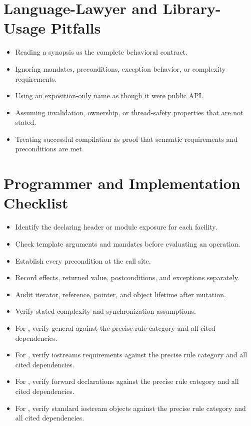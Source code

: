 \documentclass[11pt,letterpaper]{article}
\begin{document}
\section{Language-Lawyer and Library-Usage Pitfalls}
\begin{CornellReferencePitfallBox}\begin{itemize}[label=\textcolor{CornellReferenceAmber}{$\blacktriangleright$}]
\item Reading a synopsis as the complete behavioral contract.
\item Ignoring mandates, preconditions, exception behavior, or complexity requirements.
\item Using an exposition-only name as though it were public API.
\item Assuming invalidation, ownership, or thread-safety properties that are not stated.
\item Treating successful compilation as proof that semantic requirements and preconditions are met.
\end{itemize}\end{CornellReferencePitfallBox}
\section{Programmer and Implementation Checklist}
\begin{CornellReferenceChecklistBox}\begin{itemize}[label=$\square$]
\item Identify the declaring header or module exposure for each facility.
\item Check template arguments and mandates before evaluating an operation.
\item Establish every precondition at the call site.
\item Record effects, returned value, postconditions, and exceptions separately.
\item Audit iterator, reference, pointer, and object lifetime after mutation.
\item Verify stated complexity and synchronization assumptions.
\item For , verify general against the precise rule category and all cited dependencies.
\item For , verify iostreams requirements against the precise rule category and all cited dependencies.
\item For , verify forward declarations against the precise rule category and all cited dependencies.
\item For , verify standard iostream objects against the precise rule category and all cited dependencies.
\end{itemize}\end{CornellReferenceChecklistBox}
\end{document}

